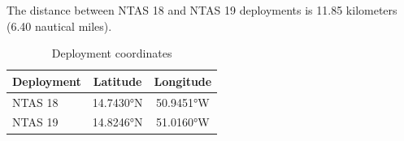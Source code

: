 
The distance between NTAS 18 and NTAS 19 deployments is 11.85 kilometers (6.40 nautical miles).

\begin{table}[ht]
\centering
\caption{Deployment coordinates}
\begin{tabular}{lcc}
\hline
\textbf{Deployment} & \textbf{Latitude} & \textbf{Longitude} \\
\hline
NTAS 18 & 14.7430°N & 50.9451°W \\
NTAS 19 & 14.8246°N & 51.0160°W \\
\hline
\end{tabular}
\end{table}
